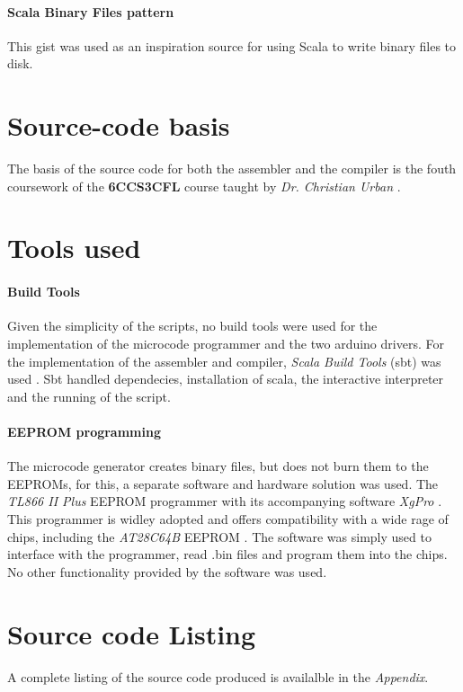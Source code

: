 \paragraph{Scala Binary Files pattern} \cite{scala-bin} This gist was used as an inspiration
source for using Scala to write binary files to disk.

\section{Source-code basis}
The basis of the source code for both the assembler and the compiler is the fouth coursework
of the \textbf{6CCS3CFL} course taught by \emph{Dr. Christian Urban} \cite{6ccs3cfl}.

\section{Tools used}

\paragraph{Build Tools} Given the simplicity of the scripts, no build tools were used for the
implementation of the microcode programmer and the two arduino drivers. For the implementation
of the assembler and compiler, \emph{Scala Build Tools} (sbt) was used \cite{sbt}. Sbt handled
dependecies, installation of scala, the interactive interpreter and the running of the script.

\paragraph{EEPROM programming} The microcode generator creates binary files, but does not
burn them to the EEPROMs, for this, a separate software and hardware solution was used.
The \emph{TL866 II Plus} \cite{eepromg_prog} EEPROM programmer with its accompanying software
\emph{XgPro} \cite{xgpro}. This programmer is widley adopted and offers compatibility with a wide rage
of chips, including the \emph{AT28C64B} EEPROM \cite{at28c64b}. The software was simply used to
interface with the programmer, read .bin files and program them into the chips. No other functionality
provided by the software was used.

\section{Source code Listing}
A complete listing of the source code produced is availalble in the \emph{Appendix}.
